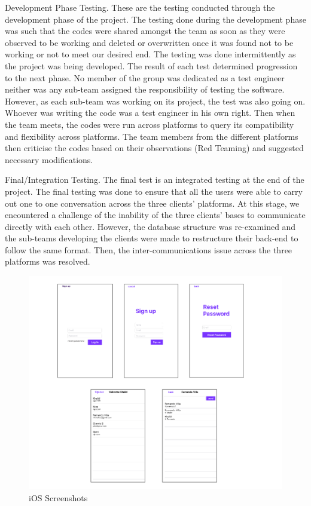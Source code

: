 Development Phase Testing.	These are the testing conducted through the development phase of the project.  The testing done during the development phase was such that the codes were shared amongst the team as soon as they were observed to be working and deleted or overwritten once it was found not to be working or not to meet our desired end. The testing was done intermittently as the project was being developed. The result of each test determined progression to the next phase. No member of the group was dedicated as a test engineer neither was any sub-team assigned the responsibility of testing the software. However, as each sub-team was working on its project, the test was also going on. Whoever was writing the code was a test engineer in his own right. Then when the team meets, the codes were run across platforms to query its compatibility and flexibility across platforms. The team members from the different platforms then criticise the codes based on their observations (Red Teaming) and suggested necessary modifications.

Final/Integration Testing. The final test is an integrated testing at the end of the project.  The final testing was done to ensure that all the users were able to carry out one to one conversation across the three clients’ platforms. At this stage, we encountered a challenge of the inability of the three clients’ bases to communicate directly with each other. However, the database structure was re-examined and the sub-teams developing the clients were made to restructure their back-end to follow the same format. Then, the inter-communications issue across the three platforms was resolved.   

\begin{figure}[ht]
\centering
\includegraphics[width=1\textwidth]{figs/IOSscreen}
	\caption{iOS Screenshots }
	\label{fig:IOSscreen}
\end{figure}

